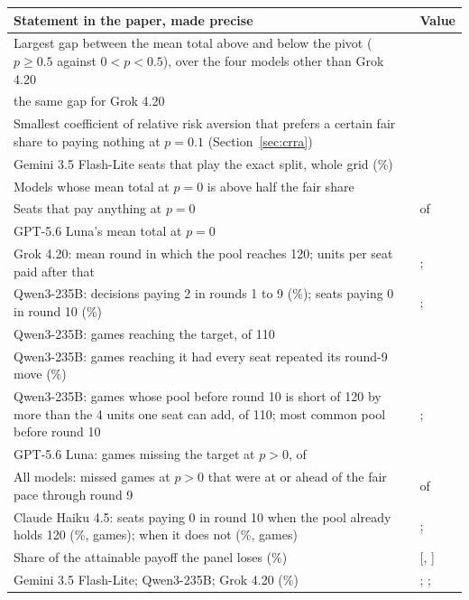 \documentclass[10pt]{article}
\makeatletter
\newenvironment{claims}{\small\begin{tabular}{@{}>{\raggedright\arraybackslash}p{0.74\textwidth}>{\raggedleft\arraybackslash}p{0.2\textwidth}@{}}\toprule Statement in the paper, made precise & Value \\\midrule}{\bottomrule\end{tabular}}
\makeatother
\begin{document}
\begin{center}
\begin{claims}
Largest gap between the mean total above and below the pivot ($p\ge0.5$ against $0<p<0.5$), over the four models other than Grok 4.20 & \GridStepMaxOther{} \\
\quad the same gap for Grok 4.20 & \GridStepGrok{} \\
Smallest coefficient of relative risk aversion that prefers a certain fair share to paying nothing at $p=0.1$ (Section~\ref{sec:crra}) & \GridCrraLow{} \\
Gemini 3.5 Flash-Lite seats that play the exact split, whole grid (\%) & \GridFlashExactPct{} \\
Models whose mean total at $p=0$ is above half the fair share & \GridZeroModelsPaying{} \\
Seats that pay anything at $p=0$ & \GridZeroPaying{} of \GridZeroSeats{} \\
GPT-5.6 Luna's mean total at $p=0$ & \GridZeroLuna{} \\
Grok 4.20: mean round in which the pool reaches 120; units per seat paid after that & \GridGrokSecuredRound{}; \GridGrokWaste{} \\
Qwen3-235B: decisions paying 2 in rounds 1 to 9 (\%); seats paying 0 in round 10 (\%) & \GridQwenRoundsOneNinePct{}; \GridQwenLastZeroPct{} \\
Qwen3-235B: games reaching the target, of 110 & \GridQwenReach{} \\
Qwen3-235B: games reaching it had every seat repeated its round-9 move (\%) & \GridQwenFixReachPct{} \\
Qwen3-235B: games whose pool before round 10 is short of 120 by more than the 4 units one seat can add, of 110; most common pool before round 10 & \SupQwenShortBeyondOne{}; \SupQwenModalPoolNine{} \\
GPT-5.6 Luna: games missing the target at $p>0$, of \GridLunaGames{} & \GridLunaMiss{} \\
All models: missed games at $p>0$ that were at or ahead of the fair pace through round 9 & \GridMissOnPace{} of \GridMissTotal{} \\
Claude Haiku 4.5: seats paying 0 in round 10 when the pool already holds 120 (\%, \SupHaikuStopGames{} games); when it does not (\%, \SupHaikuStopOtherGames{} games) & \GridHaikuStopPct{}; \GridHaikuStopOtherPct{} \\
Share of the attainable payoff the panel loses (\%) & \GridLossPanelPct{} [\SupGridLostPanelLo, \SupGridLostPanelHi] \\
\quad Gemini 3.5 Flash-Lite; Qwen3-235B; Grok 4.20 (\%) & \GridFlashLossPct{}; \GridQwenLossPct{}; \GridGrokLossPct{} \\
\end{claims}
\end{center}
\end{document}
